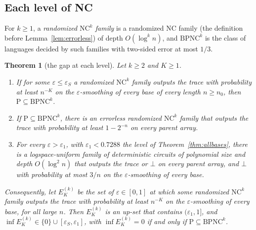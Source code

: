 \documentclass[11pt]{amsart}
\newtheorem{theorem}{Theorem}
\theoremstyle{definition}
\theoremstyle{remark}
\newcommand{\eps}{\varepsilon}
\begin{document}
\subsection{Each level of NC}

For $k\ge1$, a \emph{randomized $\mathrm{NC}^k$ family} is a randomized NC family (the definition
before Lemma~\ref{lem:errorless}) of depth $O(\log^kn)$, and $\mathrm{BPNC}^k$ is the class of languages
decided by such families with two-sided error at most $1/3$.

\begin{theorem}[the gap at each level]\label{thm:levels}
Let $k\ge2$ and $K\ge1$.
\begin{enumerate}[label=(\alph*),leftmargin=2.4em]
\item If for some $\eps\le\eps_S$ a randomized $\mathrm{NC}^k$ family outputs the trace with
probability at least $n^{-K}$ on the $\eps$-smoothing of every base of every length $n\ge n_0$,
then $\mathrm P\subseteq\mathrm{BPNC}^k$.
\item If $\mathrm P\subseteq\mathrm{BPNC}^k$, there is an errorless randomized $\mathrm{NC}^k$
family that outputs the trace with probability at least $1-2^{-n}$ on every parent array.
\item For every $\eps>\eps_1$, with $\eps_1<0.7288$ the level of Theorem~\ref{thm:allbases}, there
is a logspace-uniform family of deterministic circuits of polynomial size and depth $O(\log^2n)$
that outputs the trace or $\bot$ on every parent array, and $\bot$ with probability at most $3/n$
on the $\eps$-smoothing of every base.
\end{enumerate}
Consequently, let $E^{(k)}_K$ be the set of $\eps\in[0,1]$ at which some randomized
$\mathrm{NC}^k$ family outputs the trace with probability at least $n^{-K}$ on the
$\eps$-smoothing of every base, for all large $n$. Then $E^{(k)}_K$ is an up-set that contains
$(\eps_1,1]$, and $\inf E^{(k)}_K\in\{0\}\cup[\eps_S,\eps_1]$, with $\inf E^{(k)}_K=0$ if and only if
$\mathrm P\subseteq\mathrm{BPNC}^k$.
\end{theorem}
\end{document}
